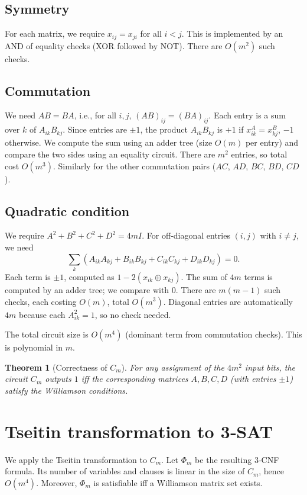 \documentclass[11pt,a4paper]{article}
\newtheorem{theorem}{Theorem}[section]
\begin{document}
\subsection{Symmetry}
For each matrix, we require $x_{ij}=x_{ji}$ for all $i<j$. This is implemented by an AND of equality checks (XOR followed by NOT). There are $O(m^2)$ such checks.

\subsection{Commutation}
We need $AB=BA$, i.e., for all $i,j$, $(AB)_{ij} = (BA)_{ij}$. Each entry is a sum over $k$ of $A_{ik}B_{kj}$. Since entries are $\pm1$, the product $A_{ik}B_{kj}$ is $+1$ if $x_{ik}^A = x_{kj}^B$, $-1$ otherwise. We compute the sum using an adder tree (size $O(m)$ per entry) and compare the two sides using an equality circuit. There are $m^2$ entries, so total cost $O(m^3)$. Similarly for the other commutation pairs ($AC$, $AD$, $BC$, $BD$, $CD$).

\subsection{Quadratic condition}
We require $A^2+B^2+C^2+D^2 = 4m I$. For off‑diagonal entries $(i,j)$ with $i\neq j$, we need
\[
\sum_{k} (A_{ik}A_{kj} + B_{ik}B_{kj} + C_{ik}C_{kj} + D_{ik}D_{kj}) = 0.
\]
Each term is $\pm1$, computed as $1-2(x_{ik}\oplus x_{kj})$. The sum of $4m$ terms is computed by an adder tree; we compare with $0$. There are $m(m-1)$ such checks, each costing $O(m)$, total $O(m^3)$. Diagonal entries are automatically $4m$ because each $A_{ik}^2=1$, so no check needed.

The total circuit size is $O(m^4)$ (dominant term from commutation checks). This is polynomial in $m$.

\begin{theorem}[Correctness of $C_m$]
For any assignment of the $4m^2$ input bits, the circuit $C_m$ outputs $1$ iff the corresponding matrices $A,B,C,D$ (with entries $\pm1$) satisfy the Williamson conditions.
\end{theorem}

\section{Tseitin transformation to 3‑SAT}

We apply the Tseitin transformation to $C_m$. Let $\Phi_m$ be the resulting 3‑CNF formula. Its number of variables and clauses is linear in the size of $C_m$, hence $O(m^4)$. Moreover, $\Phi_m$ is satisfiable iff a Williamson matrix set exists.
\end{document}
